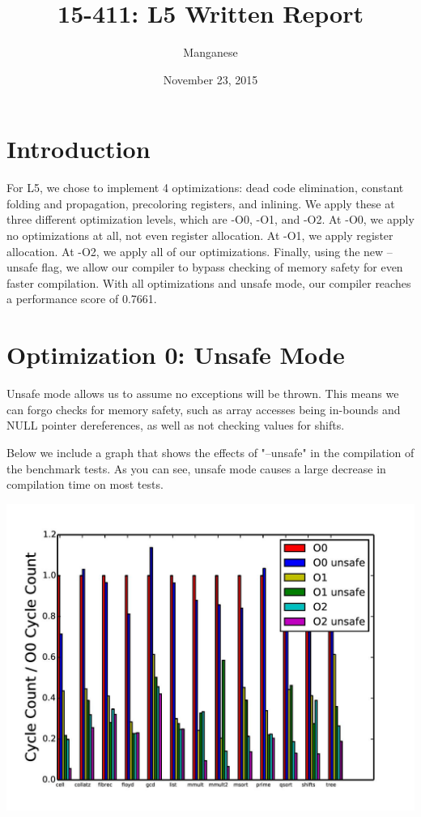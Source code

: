 \documentclass{article}
\title{15-411: L5 Written Report}
\author{Manganese}
\date{November 23, 2015}
\begin{document}
\maketitle

\section{Introduction}

For L5, we chose to implement 4 optimizations: dead code elimination, constant folding and propagation, precoloring registers, and inlining. We apply these at three different optimization levels, which are -O0, -O1, and -O2. At -O0, we apply no optimizations at all, not even register allocation. At -O1, we apply register allocation. At -O2, we apply all of our optimizations. Finally, using the new --unsafe flag, we allow our compiler to bypass checking of memory safety for even faster compilation. With all optimizations and unsafe mode, our compiler reaches a performance score of 0.7661.

\section{Optimization 0: Unsafe Mode}

Unsafe mode allows us to assume no exceptions will be thrown. This means we can forgo checks for memory safety, such as array accesses being in-bounds and NULL pointer dereferences, as well as not checking values for shifts.  

Below we include a graph that shows the effects of "--unsafe" in the compilation of the benchmark tests. As you can see, unsafe mode causes a large decrease in compilation time on most tests. 

\includegraphics[scale=0.5]{everything-page-001}
\end{document}
